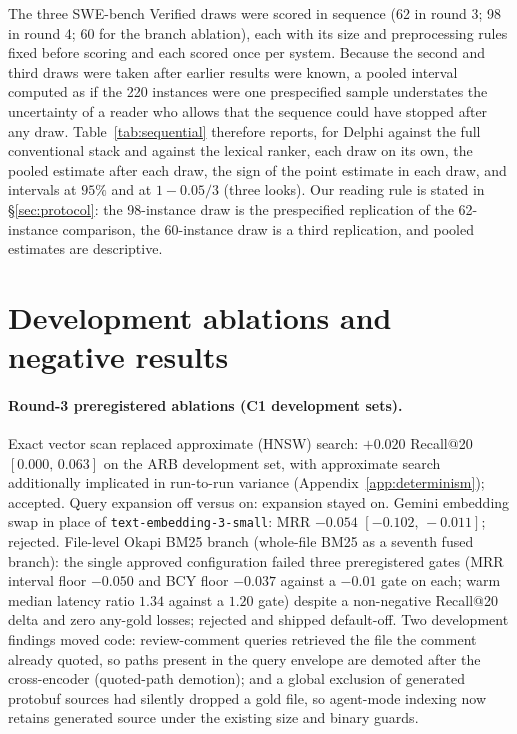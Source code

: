 \documentclass{article}
\newcommand{\ci}[2]{{\footnotesize$[#1,\,#2]$}}
\newcommand{\system}{Delphi}
\begin{document}
The three SWE-bench Verified draws were scored in sequence (62 in round 3; 98 in round 4; 60 for the branch ablation), each with its size and preprocessing rules fixed before scoring and each scored once per system. Because the second and third draws were taken after earlier results were known, a pooled interval computed as if the 220 instances were one prespecified sample understates the uncertainty of a reader who allows that the sequence could have stopped after any draw. Table~\ref{tab:sequential} therefore reports, for \system{} against the full conventional stack and against the lexical ranker, each draw on its own, the pooled estimate after each draw, the sign of the point estimate in each draw, and intervals at $95\%$ and at $1-0.05/3$ (three looks). Our reading rule is stated in \S\ref{sec:protocol}: the 98-instance draw is the prespecified replication of the 62-instance comparison, the 60-instance draw is a third replication, and pooled estimates are descriptive.

\begin{table}[h]
\centering
\caption{Sequential view of the SWE-bench draws: paired \system{}$-$system mean differences with repository-cluster bootstrap intervals at $95\%$ and adjusted for three looks ($98.3\%$); $^{*}$ excludes zero at the adjusted level. Pooled rows accumulate the draws in the order they were taken.}
\label{tab:sequential}
\footnotesize
\setlength{\tabcolsep}{3pt}
\resizebox{\textwidth}{!}{}
\end{table}

\section{Development ablations and negative results}
\label{app:development}

\paragraph{Round-3 preregistered ablations (C1 development sets).} Exact vector scan replaced approximate (HNSW) search: $+0.020$ Recall@20 \ci{0.000}{0.063} on the ARB development set, with approximate search additionally implicated in run-to-run variance (Appendix~\ref{app:determinism}); accepted. Query expansion off versus on: expansion stayed on. Gemini embedding swap in place of \texttt{text-embedding-3-small}: MRR $-0.054$ \ci{-0.102}{-0.011}; rejected. File-level Okapi BM25 branch (whole-file BM25 as a seventh fused branch): the single approved configuration failed three preregistered gates (MRR interval floor $-0.050$ and BCY floor $-0.037$ against a $-0.01$ gate on each; warm median latency ratio $1.34$ against a $1.20$ gate) despite a non-negative Recall@20 delta and zero any-gold losses; rejected and shipped default-off. Two development findings moved code: review-comment queries retrieved the file the comment already quoted, so paths present in the query envelope are demoted after the cross-encoder (quoted-path demotion); and a global exclusion of generated protobuf sources had silently dropped a gold file, so agent-mode indexing now retains generated source under the existing size and binary guards.
\end{document}
